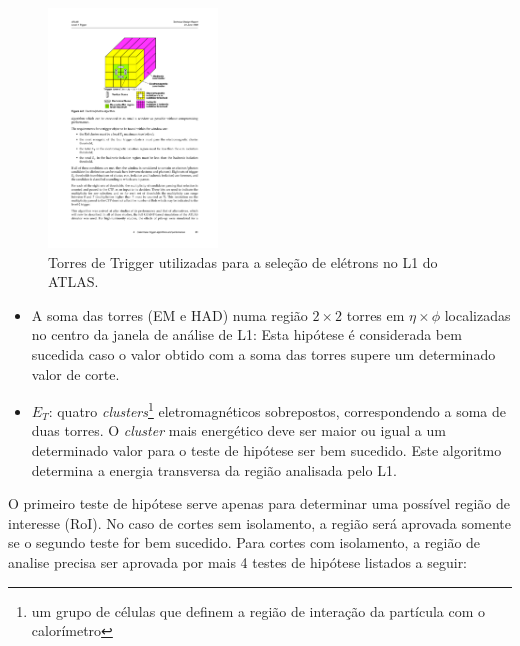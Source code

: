 \begin{figure}[h!t]
\centering
\includegraphics[width=0.4\textwidth]{figures/sliding_window_l1.pdf}
\caption[Torres de Trigger do primeiro nível de Trigger]{Torres de Trigger utilizadas para a seleção de elétrons no L1 do ATLAS. }
\label{fig:sliding_window_l1}
\end{figure}

\begin{itemize}
\item A soma das torres (EM e HAD) numa região $2\times2$ torres  em $\eta\times\phi$ localizadas no centro da janela de análise de L1: Esta hipótese é considerada bem sucedida caso o valor obtido com a soma das torres supere um determinado valor de corte.

\item $E_{T}$: quatro \textit{clusters}\footnote{um grupo de células que definem a região de interação da partícula com o calorímetro} eletromagnéticos sobrepostos, correspondendo a soma de duas torres. O \textit{cluster} mais energético deve ser maior ou igual a um determinado valor para o teste de hipótese ser bem sucedido. Este algoritmo determina a energia transversa da região analisada pelo L1.

\end{itemize}

O primeiro teste de hipótese serve apenas para determinar uma possível região de interesse (RoI). No caso de cortes sem isolamento, a região será aprovada somente se o segundo teste for bem sucedido. Para cortes com isolamento, a região de analise precisa ser aprovada por mais 4 testes de hipótese listados a seguir:

